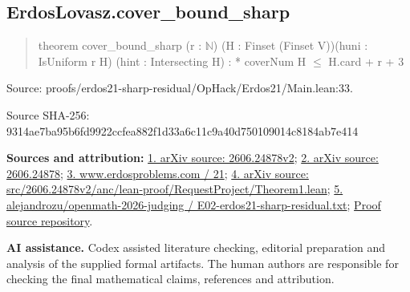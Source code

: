 \documentclass[11pt,a4paper]{article}
\begin{document}
\begin{samepage}
\subsection{ErdosLovasz.cover\_bound\_sharp}
\begin{quote}\small\ttfamily theorem cover\_bound\_sharp (r : \ensuremath{\mathbb{N}}) (H : Finset (Finset V))\newline     (huni : IsUniform r H) (hint : Intersecting H) : * coverNum H \ensuremath{\leq} H.card + r + 3\end{quote}
{\small Source: proofs/erdos21-sharp-residual/OpHack/Erdos21/Main.lean:33.\par}

{\small Source SHA-256: 9314ae7ba95b6fd9922ccfea882f1d33a6c11c9a40d750109014c8184ab7e414\par}

{\small\textbf{Sources and attribution:} \href{https://arxiv.org/html/2606.24878v2}{1. arXiv source: 2606.24878v2}; \href{https://arxiv.org/abs/2606.24878}{2. arXiv source: 2606.24878}; \href{https://www.erdosproblems.com/21}{3. www.erdosproblems.com / 21}; \href{https://arxiv.org/src/2606.24878v2/anc/lean-proof/RequestProject/Theorem1.lean}{4. arXiv source: src/2606.24878v2/anc/lean-proof/RequestProject/Theorem1.lean}; \href{https://github.com/alejandrozu/openmath-2026-judging/blob/d0ed487f487fa7ec814ff705ab55249983fe8707/OpenMath-Judging/review/entries/E02-erdos21-sharp-residual.txt}{5. alejandrozu/openmath-2026-judging / E02-erdos21-sharp-residual.txt}; \href{https://github.com/alejandrozu/openmath-2026-judging}{Proof source repository}.\par}

\end{samepage}
{\small \textbf{AI assistance.} Codex assisted literature checking, editorial preparation and analysis of the supplied formal artifacts. The human authors are responsible for checking the final mathematical claims, references and attribution.\par}
\end{document}

